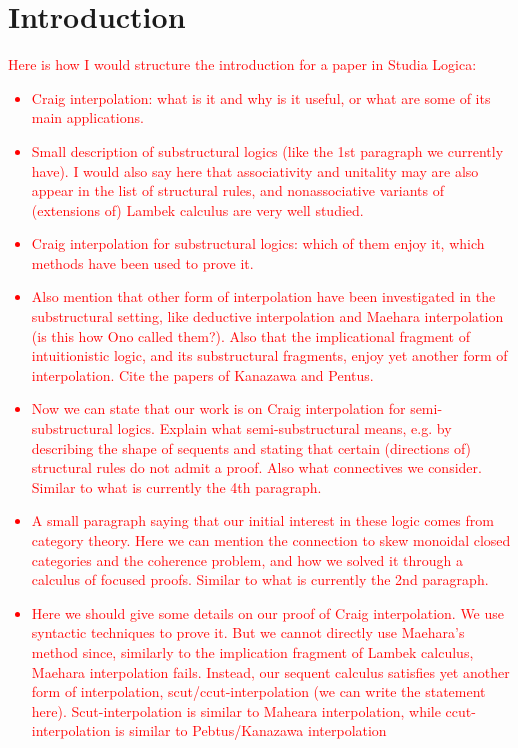 \documentclass[sn-mathphys-num]{sn-jnl}%
\newcommand{\niccolo}[1]{\textcolor{red}{#1}}
\theoremstyle{thmstyleone}%
\theoremstyle{thmstyletwo}%
\theoremstyle{thmstylethree}%
\begin{document}
\section{Introduction}\label{sec:intro}
\niccolo{Here is how I would structure the introduction for a paper in Studia Logica:
  \begin{itemize}
  \item Craig interpolation: what is it and why is it useful, or what are some of its main applications.
  \item Small description of substructural logics (like the 1st paragraph we currently have). I would also say here that associativity and unitality may are also appear in the list of structural rules, and nonassociative variants of (extensions of) Lambek calculus are very well studied.
  \item Craig interpolation for substructural logics: which of them enjoy it, which methods have been used to prove it.
  \item Also mention that other form of interpolation have been investigated in the substructural setting, like deductive interpolation and Maehara interpolation (is this how Ono called them?). Also that the implicational fragment of intuitionistic logic, and its substructural fragments, enjoy yet another form of interpolation. Cite the papers of Kanazawa and Pentus.
  \item Now we can state that our work is on Craig interpolation for semi-substructural logics. Explain what semi-substructural means, e.g. by describing the shape of sequents and stating that certain (directions of) structural rules do not admit a proof. Also what connectives we consider. Similar to what is currently the 4th paragraph. 
  \item A small paragraph saying that our initial interest in these logic comes from category theory. Here we can mention the connection to skew monoidal closed categories and the coherence problem, and how we solved it through a calculus of focused proofs. Similar to what is currently the 2nd paragraph.
  \item Here we should give some details on our proof of Craig interpolation. We use syntactic techniques to prove it. But we cannot directly use Maehara's method since, similarly to the implication fragment of Lambek calculus, Maehara interpolation fails. Instead, our sequent calculus satisfies yet another form of interpolation, scut/ccut-interpolation (we can write the statement here). Scut-interpolation is similar to Maheara interpolation, while ccut-interpolation is similar to Pebtus/Kanazawa interpolation

\end{itemize}}
\end{document}
